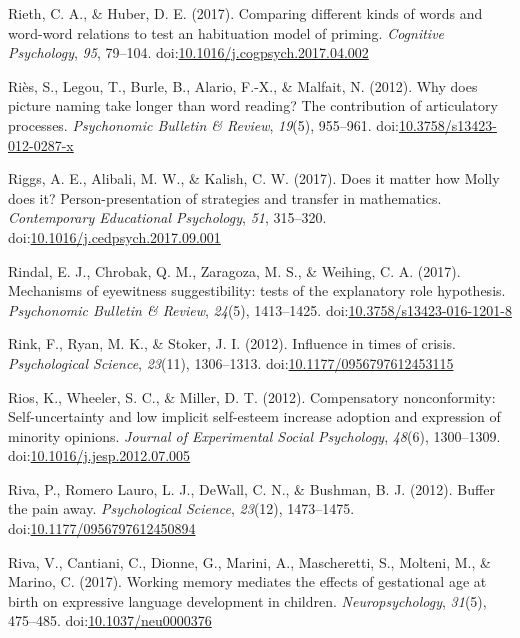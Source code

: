 \documentclass[english,man]{apa6}
\theoremstyle{definition}
\theoremstyle{definition}
\theoremstyle{definition}
\theoremstyle{remark}
\begin{document}
\hypertarget{ref-Rieth2017}{}
Rieth, C. A., \& Huber, D. E. (2017). Comparing different kinds of words
and word-word relations to test an habituation model of priming.
\emph{Cognitive Psychology}, \emph{95}, 79--104.
doi:\href{https://doi.org/10.1016/j.cogpsych.2017.04.002}{10.1016/j.cogpsych.2017.04.002}

\hypertarget{ref-Ries2012}{}
Riès, S., Legou, T., Burle, B., Alario, F.-X., \& Malfait, N. (2012).
Why does picture naming take longer than word reading? The contribution
of articulatory processes. \emph{Psychonomic Bulletin \& Review},
\emph{19}(5), 955--961.
doi:\href{https://doi.org/10.3758/s13423-012-0287-x}{10.3758/s13423-012-0287-x}

\hypertarget{ref-Riggs2017}{}
Riggs, A. E., Alibali, M. W., \& Kalish, C. W. (2017). Does it matter
how Molly does it? Person-presentation of strategies and transfer in
mathematics. \emph{Contemporary Educational Psychology}, \emph{51},
315--320.
doi:\href{https://doi.org/10.1016/j.cedpsych.2017.09.001}{10.1016/j.cedpsych.2017.09.001}

\hypertarget{ref-Rindal2017}{}
Rindal, E. J., Chrobak, Q. M., Zaragoza, M. S., \& Weihing, C. A.
(2017). Mechanisms of eyewitness suggestibility: tests of the
explanatory role hypothesis. \emph{Psychonomic Bulletin \& Review},
\emph{24}(5), 1413--1425.
doi:\href{https://doi.org/10.3758/s13423-016-1201-8}{10.3758/s13423-016-1201-8}

\hypertarget{ref-Rink2012}{}
Rink, F., Ryan, M. K., \& Stoker, J. I. (2012). Influence in times of
crisis. \emph{Psychological Science}, \emph{23}(11), 1306--1313.
doi:\href{https://doi.org/10.1177/0956797612453115}{10.1177/0956797612453115}

\hypertarget{ref-Rios2012}{}
Rios, K., Wheeler, S. C., \& Miller, D. T. (2012). Compensatory
nonconformity: Self-uncertainty and low implicit self-esteem increase
adoption and expression of minority opinions. \emph{Journal of
Experimental Social Psychology}, \emph{48}(6), 1300--1309.
doi:\href{https://doi.org/10.1016/j.jesp.2012.07.005}{10.1016/j.jesp.2012.07.005}

\hypertarget{ref-Riva2012}{}
Riva, P., Romero Lauro, L. J., DeWall, C. N., \& Bushman, B. J. (2012).
Buffer the pain away. \emph{Psychological Science}, \emph{23}(12),
1473--1475.
doi:\href{https://doi.org/10.1177/0956797612450894}{10.1177/0956797612450894}

\hypertarget{ref-Riva2017}{}
Riva, V., Cantiani, C., Dionne, G., Marini, A., Mascheretti, S.,
Molteni, M., \& Marino, C. (2017). Working memory mediates the effects
of gestational age at birth on expressive language development in
children. \emph{Neuropsychology}, \emph{31}(5), 475--485.
doi:\href{https://doi.org/10.1037/neu0000376}{10.1037/neu0000376}
\end{document}
